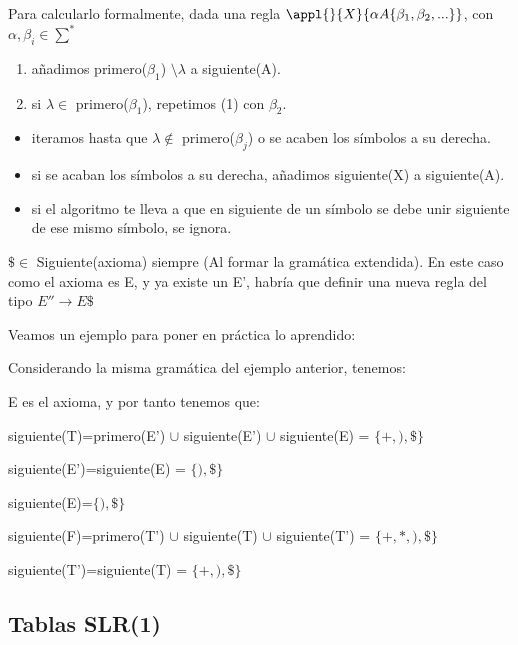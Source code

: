\documentclass{apuntes}
\begin{document}
Para calcularlo formalmente, dada una regla $\appl{}{X}{\alpha A \{\beta_1,\beta_2,...\}}$, con $\alpha, \beta_i \in \sum^*$
\begin{enumerate}
\item añadimos primero($\beta_1$) $\setminus \lambda$  a siguiente(A).
\item si $\lambda \in$ primero($\beta_1$), repetimos (1) con $\beta_2$.
\end{enumerate}
\begin{itemize}
\item iteramos hasta que $\lambda \notin$ primero($\beta_j$) o se acaben los símbolos a su derecha.
\item si se acaban los símbolos a su derecha, añadimos siguiente(X) a siguiente(A).
\item si el algoritmo te lleva a que en siguiente de un símbolo se debe unir siguiente de ese mismo símbolo, se ignora.
\end{itemize}

\obs $\$ \in $ Siguiente(axioma) siempre (Al formar la gramática extendida). En este caso como el axioma es E, y ya existe un E', habría que definir una nueva regla del tipo $E'' \rightarrow E\$$

Veamos un ejemplo para poner en práctica lo aprendido:

\begin{example}
Considerando la misma gramática del ejemplo anterior, tenemos:

E es el axioma, y por tanto tenemos que:

siguiente(T)=primero(E') $\cup$ siguiente(E') $\cup$ siguiente(E) = $\{ +, ), \$\}$

siguiente(E')=siguiente(E) = $\{ ), \$ \}$

siguiente(E)=$\{ ), \$\}$

siguiente(F)=primero(T') $\cup$ siguiente(T) $\cup$ siguiente(T') = $\{ +, *, ), \$ \}$

siguiente(T')=siguiente(T) = $\{ +, ), \$ \}$
\end{example}


\subsection{Tablas SLR(1)}
\end{document}
